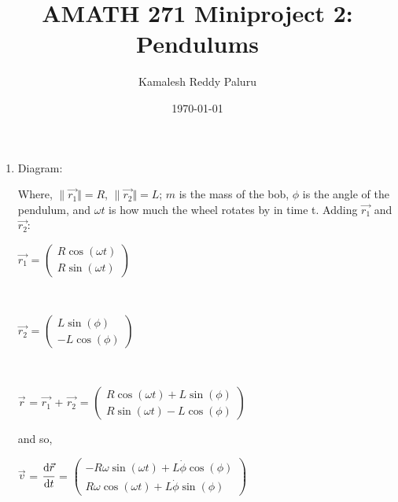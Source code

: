 \documentclass[11pt]{article}
\title{AMATH 271 Miniproject 2: \\ Pendulums}
\author{Kamalesh Reddy Paluru}
\date{\today}
\begin{document}
\maketitle


\begin{enumerate}

\item Diagram:

\begin{center}
\end{center}

Where, $\|\vec{r_1} \Vert = R$, $\|\vec{r_2} \Vert = L$; $m$ is the mass of the bob, $\phi$ is the angle of the pendulum, and $\omega t$ is how much the wheel rotates by in time t.
Adding $\vec{r_1}$ and $\vec{r_2}$:

$\vec{r_1}$ = 
$\begin{pmatrix}
  R \cos(\omega t) \\
  R \sin(\omega t)  
\end{pmatrix}$

\

$\vec{r_2}$ = 
$\begin{pmatrix}
  L \sin(\phi) \\
  -L \cos(\phi)  
\end{pmatrix}$

\

$\vec{r}$ = $\vec{r_1}$ + $\vec{r_2}$ = 
$\begin{pmatrix}
  R \cos(\omega t) + L \sin(\phi) \\
  R \sin(\omega t) - L \cos(\phi)  
\end{pmatrix}$

and so, \

$\vec{v}$ = $\cfrac{\mathrm{d} \vec{r}}{\mathrm{d} t}$ = 
$\begin{pmatrix}
  -R \omega \sin(\omega t) + L \dot{\phi} \cos(\phi) \\
  R \omega \cos(\omega t) + L \dot{\phi} \sin(\phi)  
\end{pmatrix}$


\end{enumerate}
\end{document}
